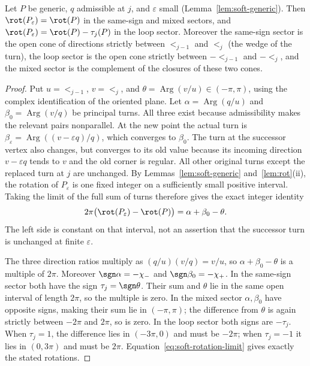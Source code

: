 \begin{lemma}\label{lem:soft-rotation}\leanok
Let $P$ be generic, $q$ admissible at $j$, and $\varepsilon$ small
(Lemma~\ref{lem:soft-generic}). Then $\rot(P_\varepsilon)=\rot(P)$ in the
same-sign and mixed sectors, and $\rot(P_\varepsilon)=\rot(P)-\tau_j(P)$ in
the loop sector. Moreover the same-sign sector is the open cone of directions
strictly between $\lt_{j-1}$ and $\lt_j$ (the wedge of the turn), the loop
sector is the open cone strictly between $-\lt_{j-1}$ and $-\lt_j$, and the
mixed sector is the complement of the closures of these two cones.

\end{lemma}
\begin{proof}\leanok{}
Put $u=\lt_{j-1}$, $v=\lt_j$, and
$\theta=\operatorname{Arg}(v/u)\in(-\pi,\pi)$, using the complex
identification of the oriented plane. Let
$\alpha=\operatorname{Arg}(q/u)$ and
$\beta_0=\operatorname{Arg}(v/q)$ be principal turns. All three
exist because admissibility makes the relevant pairs nonparallel.
At the new point the actual turn is
$\beta_\varepsilon=\operatorname{Arg}((v-\varepsilon q)/q)$,
which converges to $\beta_0$. The turn at the successor vertex also
changes, but converges to its old value because its incoming direction
$v-\varepsilon q$ tends to $v$ and the old corner is regular.
All other original turns except the replaced turn at $j$ are unchanged.
By Lemmas~\ref{lem:soft-generic} and~\ref{lem:rot}(ii), the rotation
of $P_\varepsilon$ is one fixed integer on a sufficiently small
positive interval. Taking the limit of the full sum of turns therefore
gives the exact integer identity
\begin{equation}\label{eq:soft-rotation-limit}
2\pi\bigl(\rot(P_\varepsilon)-\rot(P)\bigr)
=\alpha+\beta_0-\theta.
\end{equation}
The left side is constant on that interval, not an assertion that the
successor turn is unchanged at finite $\varepsilon$.

The three direction ratios multiply as $(q/u)(v/q)=v/u$, so
$\alpha+\beta_0-\theta$ is a multiple of $2\pi$.
Moreover $\sgn\alpha=-\chi_-$ and $\sgn\beta_0=-\chi_+$.
In the same-sign sector both have the sign $\tau_j=\sgn\theta$.
Their sum and $\theta$ lie in the same open interval of length $2\pi$,
so the multiple is zero. In the mixed sector $\alpha,\beta_0$ have
opposite signs, making their sum lie in $(-\pi,\pi)$; the difference
from $\theta$ is again strictly between $-2\pi$ and $2\pi$, so is zero.
In the loop sector both signs are $-\tau_j$. When $\tau_j=1$,
the difference lies in $(-3\pi,0)$ and must be $-2\pi$; when
$\tau_j=-1$ it lies in $(0,3\pi)$ and must be $2\pi$.
Equation~\eqref{eq:soft-rotation-limit} gives exactly the stated rotations.


\end{proof}
